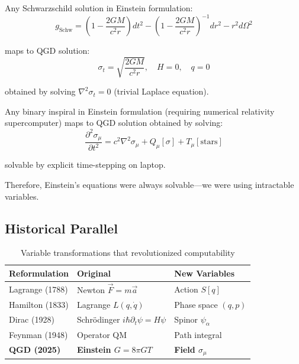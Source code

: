 \documentclass[11pt,a4paper]{article}
\theoremstyle{definition}
\theoremstyle{remark}
\begin{document}
		Any Schwarzschild solution in Einstein formulation:
		\begin{equation}
			g_{\text{Schw}} = \left(1-\frac{2GM}{c^2r}\right)dt^2 - \left(1-\frac{2GM}{c^2r}\right)^{-1}dr^2 - r^2d\Omega^2
		\end{equation}
		
		maps to QGD solution:
		\begin{equation}
			\sigma_t = \sqrt{\frac{2GM}{c^2r}}, \quad H = 0, \quad q = 0
		\end{equation}
		
		obtained by solving $\nabla^2\sigma_t = 0$ (trivial Laplace equation).
		
		Any binary inspiral in Einstein formulation (requiring numerical relativity supercomputer) maps to QGD solution obtained by solving:
		\begin{equation}
			\frac{\partial^2\sigma_\mu}{\partial t^2} = c^2\nabla^2\sigma_\mu + Q_\mu[\sigma] + T_\mu[\text{stars}]
		\end{equation}
		
		solvable by explicit time-stepping on laptop.
		
		Therefore, Einstein's equations were always solvable—we were using intractable variables.
	
	\subsection{Historical Parallel}
	
	\begin{table}[h]
		\centering
		\caption{Variable transformations that revolutionized computability}
		\begin{tabular}{@{}lll@{}}
			\toprule
			\textbf{Reformulation} & \textbf{Original} & \textbf{New Variables} \\
			\midrule
			Lagrange (1788) & Newton $\vec{F} = m\vec{a}$ & Action $S[q]$ \\
			Hamilton (1833) & Lagrange $L(q, \dot{q})$ & Phase space $(q, p)$ \\
			Dirac (1928) & Schrödinger $i\hbar\partial_t\psi = H\psi$ & Spinor $\psi_\alpha$ \\
			Feynman (1948) & Operator QM & Path integral \\
			\textbf{QGD (2025)} & \textbf{Einstein $G = 8\pi GT$} & \textbf{Field $\sigma_\mu$} \\
			\bottomrule
		\end{tabular}
	\end{table}
	
\end{document}
